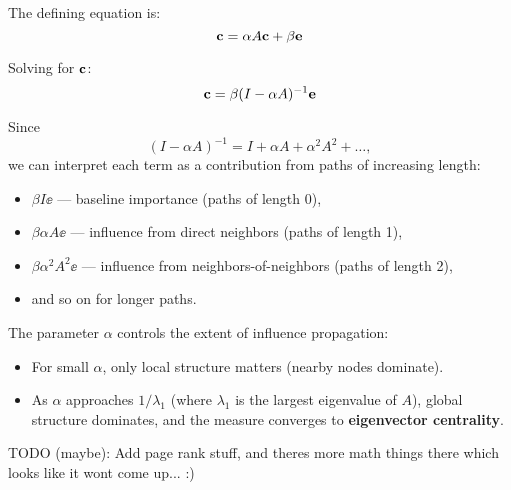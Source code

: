 \noindent
The defining equation is:
\[
\mathbf{c} = \alpha A \mathbf{c} + \beta \mathbf{e}
\]

\noindent
Solving for $\mathbf{c}$:
\[
\mathbf{c} = \beta (I - \alpha A)^{-1} \mathbf{e}
\]

\noindent
Since
\[
(I - \alpha A)^{-1} = I + \alpha A + \alpha^2 A^2 + \dots,
\]
we can interpret each term as a contribution from paths of increasing length:

\begin{itemize}
    \item $\beta I \ee$ — baseline importance (paths of length 0),
    \item $\beta \alpha A \ee$ — influence from direct neighbors (paths of length 1),
    \item $\beta \alpha^2 A^2 \ee$ — influence from neighbors-of-neighbors (paths of length 2),
    \item and so on for longer paths.
\end{itemize}

\noindent
The parameter $\alpha$ controls the extent of influence propagation:
\begin{itemize}
    \item For small $\alpha$, only local structure matters (nearby nodes dominate).
    \item As $\alpha$ approaches $1 / \lambda_1$ (where $\lambda_1$ is the largest eigenvalue of $A$), global structure dominates, and the measure converges to \textbf{eigenvector centrality}.
\end{itemize}

TODO (maybe): Add page rank stuff, and theres more math things there which 
looks like it wont come up... :)